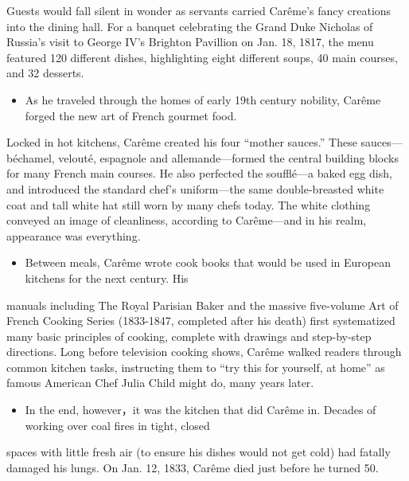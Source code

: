 \documentclass[UTF8,11pt]{ctexart}
\begin{document}
Guests would fall silent in wonder as servants carried Carême's fancy creations into the dining hall. For a banquet celebrating the Grand Duke Nicholas of Russia's visit to George IV's Brighton Pavillion on Jan. 18, 1817, the menu featured 120 different dishes, highlighting eight different soups, 40 main courses, and 32 desserts.


\begin{itemize}[leftmargin=2em,itemsep=.2em,topsep=.4em]\item[J.] As he traveled through the homes of early 19th century nobility, Carême forged the new art of French gourmet food.
\end{itemize}

Locked in hot kitchens, Carême created his four “mother sauces.” These sauces—béchamel, velouté, espagnole and allemande—formed the central building blocks for many French main courses. He also perfected the soufflé—a baked egg dish, and introduced the standard chef's uniform—the same double-breasted white coat and tall white hat still worn by many chefs today. The white clothing conveyed an image of cleanliness, according to Carême—and in his realm, appearance was everything.


\begin{itemize}[leftmargin=2em,itemsep=.2em,topsep=.4em]\item[K.] Between meals, Carême wrote cook books that would be used in European kitchens for the next century. His
\end{itemize}

manuals including The Royal Parisian Baker and the massive five-volume Art of French Cooking Series (1833-1847, completed after his death) first systematized many basic principles of cooking, complete with drawings and step-by-step directions. Long before television cooking shows, Carême walked readers through common kitchen tasks, instructing them to “try this for yourself, at home” as famous American Chef Julia Child might do, many years later.


\begin{itemize}[leftmargin=2em,itemsep=.2em,topsep=.4em]\item[L.] In the end, however，it was the kitchen that did Carême in. Decades of working over coal fires in tight, closed
\end{itemize}

spaces with little fresh air (to ensure his dishes would not get cold) had fatally damaged his lungs. On Jan. 12, 1833, Carême died just before he turned 50.
\end{document}
